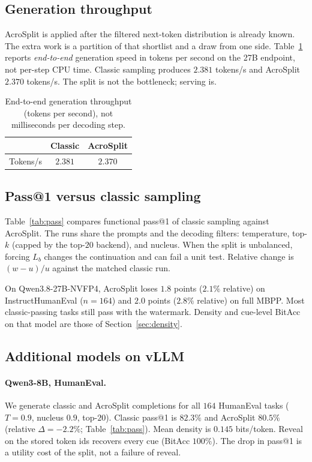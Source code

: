 \documentclass[11pt]{article}
\begin{document}
\subsection{Generation throughput}
\label{sec:overhead}

AcroSplit is applied after the filtered next-token distribution is already known.
The extra work is a partition of that shortlist and a draw from one side.
Table~\ref{tab:overhead} reports \emph{end-to-end} generation speed in tokens per second on the 27B endpoint, not per-step CPU time.
Classic sampling produces $2.381$ tokens/s and AcroSplit $2.370$ tokens/s.
The split is not the bottleneck; serving is.

\begin{table}[t]
\centering
\small
\begin{tabular}{@{}lcc@{}}
\toprule
 & Classic & AcroSplit \\
\midrule
Tokens/s & $2.381$ & $2.370$ \\
\bottomrule
\end{tabular}
\caption{End-to-end generation throughput (tokens per second), not milliseconds per decoding step.}
\label{tab:overhead}
\end{table}

\subsection{Pass@1 versus classic sampling}
\label{sec:pass}

Table~\ref{tab:pass} compares functional pass@1 of classic sampling against AcroSplit.
The runs share the prompts and the decoding filters: temperature, top-$k$ (capped by the top-$20$ backend), and nucleus.
When the split is unbalanced, forcing $L_b$ changes the continuation and can fail a unit test.
Relative change is $(w-u)/u$ against the matched classic run.

On Qwen3.8-27B-NVFP4, AcroSplit loses $1.8$ points ($2.1\%$ relative) on InstructHumanEval ($n{=}164$) and $2.0$ points ($2.8\%$ relative) on full MBPP.
Most classic-passing tasks still pass with the watermark.
Density and cue-level BitAcc on that model are those of Section~\ref{sec:density}.

\subsection{Additional models on vLLM}
\label{sec:vllm}

\paragraph{Qwen3-8B, HumanEval.}
We generate classic and AcroSplit completions for all $164$ HumanEval tasks ($T{=}0.9$, nucleus $0.9$, top-$20$).
Classic pass@1 is $82.3\%$ and AcroSplit $80.5\%$ (relative $\Delta=-2.2\%$; Table~\ref{tab:pass}).
Mean density is $0.145$ bits/token.
Reveal on the stored token ids recovers every cue (BitAcc $100\%$).
The drop in pass@1 is a utility cost of the split, not a failure of reveal.
\end{document}
